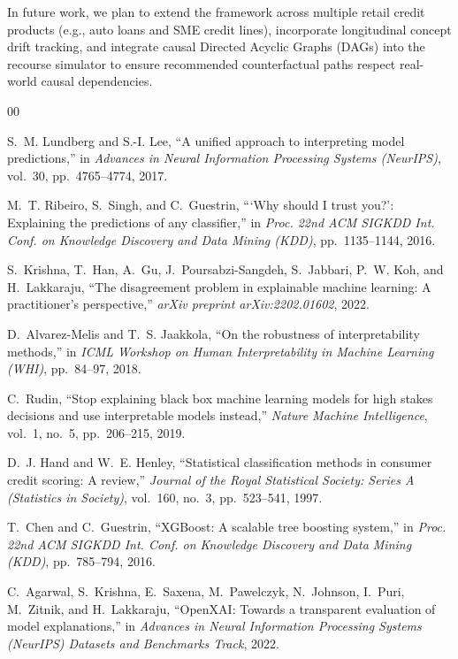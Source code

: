 \documentclass[conference]{IEEEtran}
\begin{document}
In future work, we plan to extend the framework across multiple retail credit products (e.g., auto loans and SME credit lines), incorporate longitudinal concept drift tracking, and integrate causal Directed Acyclic Graphs (DAGs) into the recourse simulator to ensure recommended counterfactual paths respect real-world causal dependencies.

\begin{thebibliography}{00}

S.~M. Lundberg and S.-I. Lee, ``A unified approach to interpreting model predictions,'' in \emph{Advances in Neural Information Processing Systems (NeurIPS)}, vol.~30, pp.~4765--4774, 2017.

M.~T. Ribeiro, S.~Singh, and C.~Guestrin, ```Why should I trust you?': Explaining the predictions of any classifier,'' in \emph{Proc. 22nd ACM SIGKDD Int. Conf. on Knowledge Discovery and Data Mining (KDD)}, pp.~1135--1144, 2016.

S.~Krishna, T.~Han, A.~Gu, J.~Poursabzi-Sangdeh, S.~Jabbari, P.~W. Koh, and H.~Lakkaraju, ``The disagreement problem in explainable machine learning: A practitioner's perspective,'' \emph{arXiv preprint arXiv:2202.01602}, 2022.

D.~Alvarez-Melis and T.~S. Jaakkola, ``On the robustness of interpretability methods,'' in \emph{ICML Workshop on Human Interpretability in Machine Learning (WHI)}, pp.~84--97, 2018.

C.~Rudin, ``Stop explaining black box machine learning models for high stakes decisions and use interpretable models instead,'' \emph{Nature Machine Intelligence}, vol.~1, no.~5, pp.~206--215, 2019.

D.~J. Hand and W.~E. Henley, ``Statistical classification methods in consumer credit scoring: A review,'' \emph{Journal of the Royal Statistical Society: Series A (Statistics in Society)}, vol.~160, no.~3, pp.~523--541, 1997.

T.~Chen and C.~Guestrin, ``XGBoost: A scalable tree boosting system,'' in \emph{Proc. 22nd ACM SIGKDD Int. Conf. on Knowledge Discovery and Data Mining (KDD)}, pp.~785--794, 2016.

C.~Agarwal, S.~Krishna, E.~Saxena, M.~Pawelczyk, N.~Johnson, I.~Puri, M.~Zitnik, and H.~Lakkaraju, ``OpenXAI: Towards a transparent evaluation of model explanations,'' in \emph{Advances in Neural Information Processing Systems (NeurIPS) Datasets and Benchmarks Track}, 2022.


\end{thebibliography}
\end{document}
